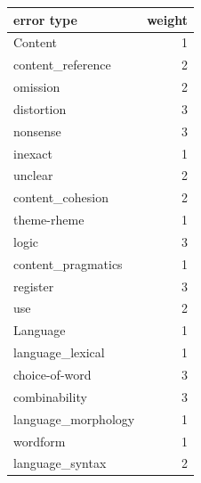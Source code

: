\begin{table}[H]
	\centering
	\begin{tabular}{lr}
		\toprule
		error type & weight \\
		\midrule
		Content               & 1   \\
		\hspace{1em}content\_reference    & 2   \\
		\hspace{3em}omission              & 2    \\
		\hspace{3em}distortion            & 3   \\
		\hspace{3em}nonsense              & 3   \\
		\hspace{3em}inexact               & 1   \\
		\hspace{3em}unclear               & 2   \\
		\hspace{1em}content\_cohesion     & 2   \\
		\hspace{3em}theme-rheme           & 1   \\
		\hspace{3em}logic                 & 3   \\
		\hspace{1em}content\_pragmatics   & 1   \\
		\hspace{3em}register              & 3   \\
		\hspace{3em}use                   & 2   \\
		\midrule
		Language              			  & 1    \\
		\hspace{1em}language\_lexical     & 1   \\
		\hspace{3em}choice-of-word        & 3  \\
		\hspace{3em}combinability         & 3  \\
		\hspace{1em}language\_morphology  & 1    \\
		\hspace{3em}wordform              & 1   \\
		\hspace{1em}language\_syntax      & 2   \\

\end{tabular}
\end{table}
